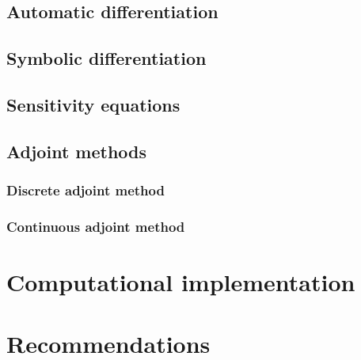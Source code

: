 \documentclass[12pt]{article}
\begin{document}
\subsection{Automatic differentiation}


\subsection{Symbolic differentiation}


\subsection{Sensitivity equations}


\subsection{Adjoint methods}
\label{section:adjoint-methods}


\subsubsection{Discrete adjoint method}


\subsubsection{Continuous adjoint method}


\section{Computational implementation}
\label{sec:computational-implementation}



\section{Recommendations}


% 
\end{document}
